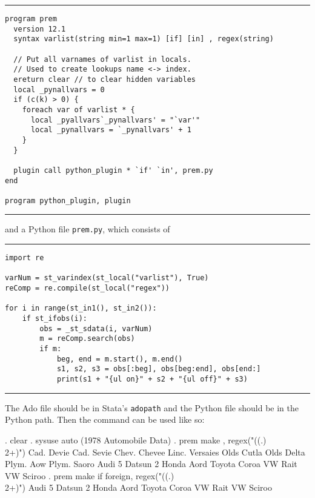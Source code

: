 \documentclass{article}
\begin{document}
\hrule
{\small
\begin{lstlisting}
program prem
  version 12.1
  syntax varlist(string min=1 max=1) [if] [in] , regex(string)
  
  // Put all varnames of varlist in locals.
  // Used to create lookups name <-> index.
  ereturn clear // to clear hidden variables
  local _pynallvars = 0
  if (c(k) > 0) {
    foreach var of varlist * {
      local _pyallvars`_pynallvars' = "`var'"
      local _pynallvars = `_pynallvars' + 1
    }
  }
  
  plugin call python_plugin * `if' `in', prem.py
end

program python_plugin, plugin
\end{lstlisting}}
\hrule
\vspace{3mm}

\noindent and a Python file \lstinline{prem.py}, which consists of\newline

\hrule
{\small
\begin{lstlisting}
import re

varNum = st_varindex(st_local("varlist"), True)
reComp = re.compile(st_local("regex"))

for i in range(st_in1(), st_in2()):
    if st_ifobs(i):
        obs = _st_sdata(i, varNum)
        m = reComp.search(obs)
        if m: 
            beg, end = m.start(), m.end()
            s1, s2, s3 = obs[:beg], obs[beg:end], obs[end:]
            print(s1 + "{ul on}" + s2 + "{ul off}" + s3)
\end{lstlisting}}
\hrule
\vspace{3mm}

The Ado file should be in Stata's \lstinline{adopath} and the Python file should be in the Python path. Then the command can be used like so:

\begin{stlog}
{\smallskip}
. clear
{\smallskip}
. sysuse auto
(1978 Automobile Data)
{\smallskip}
. prem make , regex("((.)\\2+)")
Cad. Devi{}e
Cad. Sevi{}e
Chev. Cheve{}e
Linc. Versai{}es
Olds Cutla{}
Olds Delta {}
Plym. A{}ow
Plym. Sa{}oro
Audi 5{}
Datsun 2{}
Honda A{}ord
Toyota Coro{}a
VW Ra{}it
VW Sciro{}o
{\smallskip}
. prem make if foreign, regex("((.)\\2+)")
Audi 5{}
Datsun 2{}
Honda A{}ord
Toyota Coro{}a
VW Ra{}it
VW Sciro{}o
\end{stlog}
\end{document}
